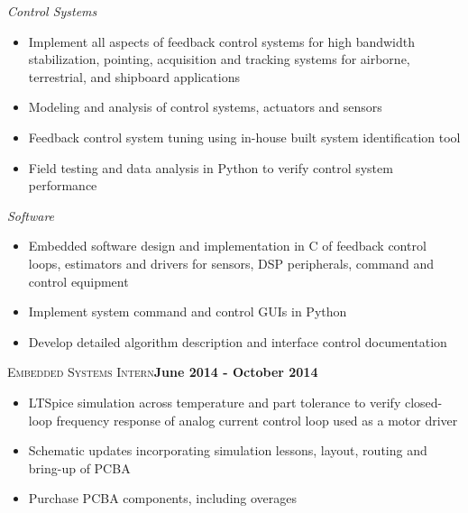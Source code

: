 \documentclass[margin,line]{resume}
\begin{document}
\begin{resume}
    \textsl{Control Systems}\\ \vspace{-4mm}
    		\begin{itemize} \itemsep -2pt
    			\item Implement all aspects of feedback control systems for high bandwidth stabilization, pointing, acquisition and tracking systems for airborne, terrestrial, and shipboard applications
    			\item Modeling and analysis of control systems, actuators and sensors
    			\item Feedback control system tuning using in-house built system identification tool
        		\item Field testing and data analysis in Python to verify control system performance
    		\end{itemize}\vspace{-4mm}
     
     \textsl{Software} \\ \vspace{-4mm}
     \begin{itemize} \itemsep -2pt
	    \item Embedded software design and implementation in C of feedback control loops, estimators and drivers for sensors, DSP peripherals, command and control equipment
        \item Implement system command and control GUIs in Python
        \item Develop detailed algorithm description and interface control documentation
    \end{itemize} \vspace{-2.25mm}
    
    \textsc{Embedded Systems Intern}\hfill \textbf{June 2014 - October 2014}\\ \vspace{-4mm}
    	\begin{itemize} \itemsep -2pt
    		\item LTSpice simulation across temperature and part tolerance to verify closed-loop frequency response of analog current control loop used as a motor driver
    		\item Schematic updates incorporating simulation lessons, layout, routing and bring-up of PCBA
    		\item Purchase PCBA components, including overages
    	\end{itemize} \vspace{-2.25mm}


\end{resume}
\end{document}
